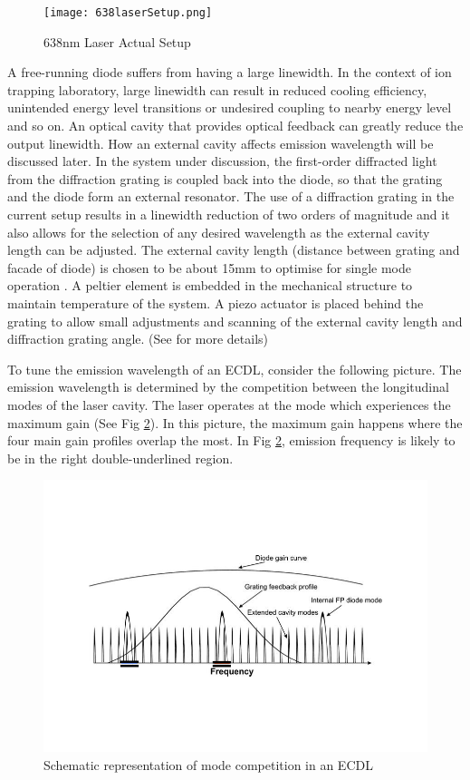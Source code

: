\documentclass[12pt]{report}
\begin{document}
\begin{figure}[H]
    \centering
    \texttt{[image: 638laserSetup.png]}
    \caption{638nm Laser Actual Setup}
    \label{fig:638laserSetup}
\end{figure}

A free-running diode suffers from having a large linewidth. In the context of ion trapping laboratory, large linewidth can result in reduced cooling efficiency, unintended energy level transitions or undesired coupling to nearby energy level and so on. An optical cavity that provides optical feedback can greatly reduce the output linewidth. How an external cavity affects emission wavelength will be discussed later. In the system under discussion, the first-order diffracted light from the diffraction grating is coupled back into the diode, so that the grating and the diode form an external resonator. The use of a diffraction grating in the current setup results in a linewidth reduction of two orders of magnitude and it also allows for the selection of any desired wavelength as the external cavity length can be adjusted\cite{compactGratingDiodeLaser}. The external cavity length (distance between grating and facade of diode) is chosen to be about 15mm to optimise for single mode operation \cite{compactGratingDiodeLaser}. A peltier element is embedded in the mechanical structure to maintain temperature of the system. A piezo actuator is placed behind the grating to allow small adjustments and scanning of the external cavity length and diffraction grating angle. (See \cite{compactGratingDiodeLaser} for more details)
\par
To tune the emission wavelength of an ECDL, consider the following picture. The emission wavelength is determined by the competition between the longitudinal modes of the laser cavity. The laser operates at the mode which experiences the maximum gain (See Fig \ref{fig:diodeLaserGainCurve}). In this picture, the maximum gain happens where the four main gain profiles overlap the most. In Fig \ref{fig:diodeLaserGainCurve}, emission frequency is likely to be in the right double-underlined region.
\begin{figure}[H]
    \centering
    \includegraphics[width=.8\textwidth]{diodeLaserGainCurve.png}
    \caption{Schematic representation of mode competition in an ECDL\cite{DiodeLaserInducedFluorescenceForGas-PhaseDiagnostics}}
    \label{fig:diodeLaserGainCurve}
\end{figure}
\end{document}
